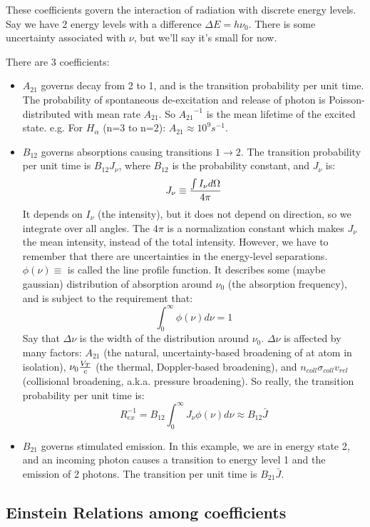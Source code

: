 \documentclass[11pt]{article}
\def\_{\bar}
\def\ato{{A_{21}}}
\def\bto{{B_{21}}}
\def\bot{{B_{12}}}
\begin{document}
These coefficients govern the interaction of radiation with discrete energy
levels.  Say we have 2 energy levels with a difference $\Delta E=h\nu_0$.
There is some uncertainty associated with $\nu$, but we'll say it's small for
now.\par
There are 3 coefficients:\par
\begin{itemize}
\item  $\ato$ governs decay from 2 to 1, and is the transition 
probability per
unit time.  The probability of spontaneous
de-excitation and release of photon is Poisson-distributed with mean rate
$\ato$. So $\ato^{-1}$ is the mean lifetime of the excited state.  e.g.
For $H_\alpha$ (n=3 to n=2): $\ato\approx 10^9 s^{-1}$.

\item  $\bot$ governs absorptions causing transitions $1\to2$.
The transition probability per unit time is $\bot J_\nu$, where $\bot$ is
the probability constant, and $J_\nu$ is:
$$J_\nu \equiv {\int{I_\nu d\Omega} \over 4\pi}$$ 
It depends on $I_\nu$ (the intensity), but it does not depend on 
direction, so we integrate over all angles.  The $4\pi$ is a normalization
constant which makes $J_\nu$ the mean intensity, instead of the total intensity.
However, we have to remember that there are uncertainties in the energy-level
separations.  $\phi(\nu)\equiv$ is called the line profile function.  It 
describes
some (maybe gaussian) distribution of absorption around $\nu_0$ (the
absorption frequency), and is subject to the requirement that:
$$\int_0^\infty{\phi(\nu)d\nu}=1$$
Say that $\Delta\nu$ is the width
of the distribution around $\nu_0$.  $\Delta \nu $ is affected by many factors:
$\ato$ (the natural, uncertainty-based broadening of at atom in isolation),
$\nu_0{V_T\over c}$ (the thermal, Doppler-based broadening), and 
$n_{coll}\sigma_{coll}v_{rel}$
(collisional broadening, a.k.a. pressure broadening).
So really, the transition probability per unit time is:
$$R_{ex}^{-1}=\bot\int_0^\infty{J_\nu\phi(\nu)d\nu}\approx\bot\_J$$

\item  $\bto$ governs stimulated emission.  In this example, we are in energy
state 2, and an incoming photon causes a transition to energy level 1 and the
emission of 2 photons.  The transition per unit time is $\bto\_J$.
\end{itemize}

\subsection*{ Einstein Relations among coefficients}
\end{document}
